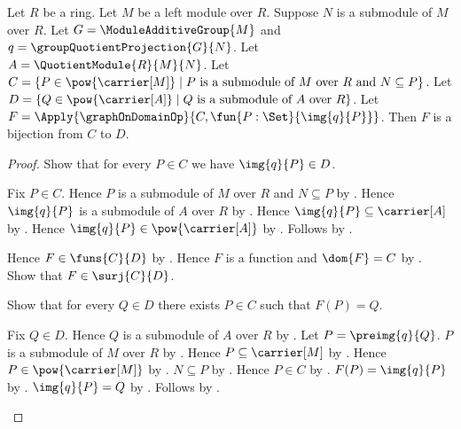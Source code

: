 \begin{theorem}\label{module_submodule_correspondence_bijection}
    Let $R$ be a ring.
    Let $M$ be a left module over $R$.
    Suppose $N$ is a submodule of $M$ over $R$.
    Let $G=\ModuleAdditiveGroup{M}$ and
        $q=\groupQuotientProjection{G}{N}$.
    Let $A=\QuotientModule{R}{M}{N}$.
    Let
        $C=\{P\in\pow{\carrier[M]}\mid
            \text{$P$ is a submodule of $M$ over $R$ and
                $N\subseteq P$}\}$.
    Let
        $D=\{Q\in\pow{\carrier[A]}\mid
            \text{$Q$ is a submodule of $A$ over $R$}\}$.
    Let
        $F=\Apply{\graphOnDomainOp}
            {C,\fun{P:\Set}{\img{q}{P}}}$.
    Then $F$ is a bijection from $C$ to $D$.
\end{theorem}
\begin{proof}
    Show that for every $P\in C$ we have $\img{q}{P}\in D$.
    \begin{subproof}
        Fix $P\in C$.
        Hence $P$ is a submodule of $M$ over $R$ and
            $N\subseteq P$ by \auto.
        Hence $\img{q}{P}$ is a submodule of $A$ over $R$ by
            .
        Hence $\img{q}{P}\subseteq\carrier[A]$ by
            .
        Hence $\img{q}{P}\in\pow{\carrier[A]}$ by
            .
        Follows by \auto.
    \end{subproof}
    Hence $F\in\funs{C}{D}$ by
        .
    Hence $F$ is a function and $\dom{F}=C$ by
        .
    Show that $F\in\surj{C}{D}$.
    \begin{subproof}
        Show that for every $Q\in D$ there exists $P\in C$ such that
            $F(P)=Q$.
        \begin{subproof}
            Fix $Q\in D$.
            Hence $Q$ is a submodule of $A$ over $R$ by \auto.
            Let $P=\preimg{q}{Q}$.
            $P$ is a submodule of $M$ over $R$ by
                .
            Hence $P\subseteq\carrier[M]$ by
                .
            Hence $P\in\pow{\carrier[M]}$ by .
            $N\subseteq P$ by
                .
            Hence $P\in C$ by \auto.
            $F(P)=\img{q}{P}$ by
                .
            $\img{q}{P}=Q$ by
                .
            Follows by \auto.
        \end{subproof}

\end{subproof}
\end{proof}
